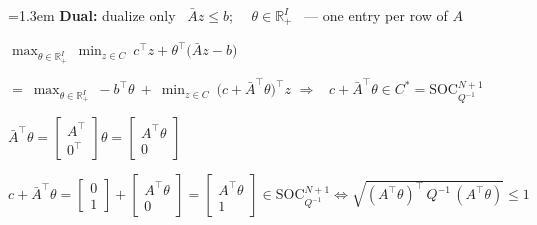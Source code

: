 \documentclass[10pt]{article}
\newenvironment{board}{%
  \par\vspace{4pt}
  \begingroup\leftskip=1.3em\relax\parskip=2pt\relax}{%
  \par\endgroup\vspace{4pt}}
\begin{document}
\begin{board}
\textbf{Dual:} \quad dualize only \ $\bar A z \le b$; \ \ $\theta \in \mathbb{R}^I_+$ \ --- one entry per row of $A$
\vspace{8pt}

\quad $\displaystyle \max_{\theta \in \mathbb{R}^I_+}\ \min_{z \in C}\
  c^{\top}z + \theta^{\top}\big(\bar A z - b\big)$
\vspace{8pt}

$\displaystyle =\ \max_{\theta \in \mathbb{R}^I_+}\ -b^{\top}\theta
  \ +\ \min_{z \in C}\ \big(c + \bar A^{\top}\theta\big)^{\!\top} z$
\qquad $\Rightarrow$ \ $c + \bar A^{\top}\theta \in C^* = \mathrm{SOC}_{Q^{-1}}^{N+1}$
\vspace{10pt}

\quad $\bar A^{\top}\theta = \begin{bmatrix} A^{\top} \\ 0^{\top} \end{bmatrix} \theta
  = \begin{bmatrix} A^{\top}\theta \\ 0 \end{bmatrix}$
\vspace{8pt}

\quad $c + \bar A^{\top}\theta = \begin{bmatrix} 0 \\ 1 \end{bmatrix} + \begin{bmatrix} A^{\top}\theta \\ 0 \end{bmatrix}
  = \begin{bmatrix} A^{\top}\theta \\ 1 \end{bmatrix} \in \mathrm{SOC}_{Q^{-1}}^{N+1}
  \iff \sqrt{(A^{\top}\theta)^{\top}\, Q^{-1}\, (A^{\top}\theta)} \le 1$
\vspace{3pt}

\vspace{10pt}


\end{board}
\end{document}
